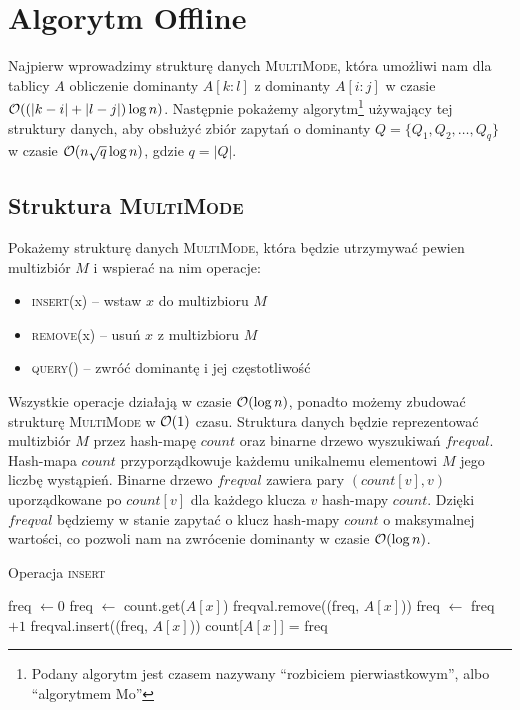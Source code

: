 \section{Algorytm Offline}
\label{sec:offline}
Najpierw wprowadzimy strukturę danych \textsc{MultiMode}, która umożliwi nam dla tablicy $A$ obliczenie dominanty $A[k:l]$ z dominanty $A[i:j]$ w czasie $\mathcal{O}( \left(|k-i| + |l-j|\right) \log n)$. Następnie pokażemy algorytm\footnote{Podany algorytm jest czasem nazywany “rozbiciem pierwiastkowym”, albo “algorytmem Mo”} używający tej struktury danych, aby obsłużyć zbiór zapytań o dominanty $Q=\{Q_1, Q_2, \dots, Q_q\}$ w czasie $\mathcal{O}(n\sqrt{q}\log n)$, gdzie $q = |Q|$.
\subsection{Struktura \textsc{MultiMode}}
Pokażemy strukturę danych \textsc{MultiMode}, która będzie utrzymywać pewien multizbiór $M$ i wspierać na nim operacje:
\begin{itemize}[nosep]
    \item \textsc{insert}(x) -- wstaw $x$ do multizbioru $M$
    \item \textsc{remove}(x) -- usuń $x$ z multizbioru $M$
    \item \textsc{query}() -- zwróć dominantę i jej częstotliwość
\end{itemize}
Wszystkie operacje działają w czasie $\mathcal{O}(\log n)$, ponadto możemy zbudować strukturę \textsc{MultiMode} w $\mathcal{O}(1)$ czasu.
Struktura danych będzie reprezentować multizbiór $M$ przez hash-mapę $count$ oraz binarne drzewo wyszukiwań $freqval$. Hash-mapa $count$ przyporządkowuje każdemu unikalnemu elementowi $M$ jego liczbę wystąpień. Binarne drzewo $freqval$ zawiera pary $(count[v], v)$ uporządkowane po $count[v]$ dla każdego klucza $v$ hash-mapy $count$. Dzięki $freqval$ będziemy w stanie zapytać o klucz hash-mapy $count$ o maksymalnej wartości, co pozwoli nam na zwrócenie dominanty w czasie $\mathcal{O}(\log n)$.\\
\begin{minipage}[t]{0.52\textwidth}
\begin{algorithm}[H]
    \caption{Operacja \textsc{insert}}
    \label{alg:offline-insert}
    \begin{algorithmic}[1]
            \State freq $\gets 0$
                \State freq $\gets$ count.get($A[x]$)
                \State freqval.remove((freq, $A[x]$))
            \EndIf
            \State freq $\gets$ freq$ + 1$
            \State freqval.insert((freq, $A[x]$))
            \State count[$A[x]$] = freq
        \EndFunction
    \end{algorithmic}
\end{algorithm}
\vspace{0.5em}
\end{minipage}
